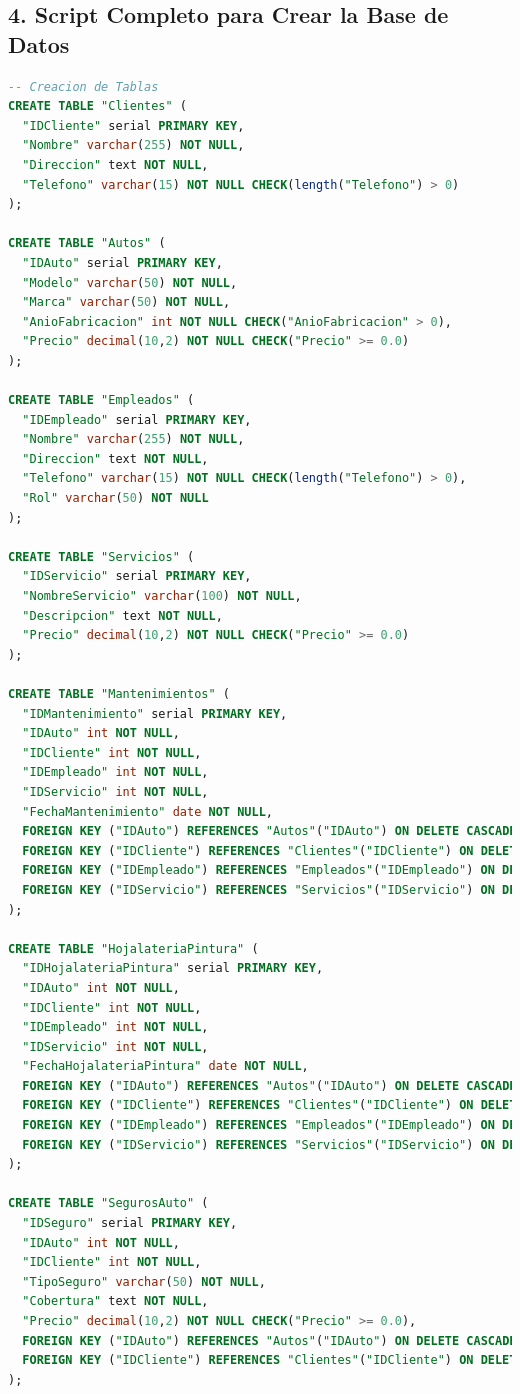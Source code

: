 \documentclass[12pt]{article}
\begin{document}
    \subsection*{4. Script Completo para Crear la Base de Datos}
    \begin{lstlisting}[language=SQL]
-- Creacion de Tablas
CREATE TABLE "Clientes" (
  "IDCliente" serial PRIMARY KEY,
  "Nombre" varchar(255) NOT NULL,
  "Direccion" text NOT NULL,
  "Telefono" varchar(15) NOT NULL CHECK(length("Telefono") > 0)
);

CREATE TABLE "Autos" (
  "IDAuto" serial PRIMARY KEY,
  "Modelo" varchar(50) NOT NULL,
  "Marca" varchar(50) NOT NULL,
  "AnioFabricacion" int NOT NULL CHECK("AnioFabricacion" > 0),
  "Precio" decimal(10,2) NOT NULL CHECK("Precio" >= 0.0)
);

CREATE TABLE "Empleados" (
  "IDEmpleado" serial PRIMARY KEY,
  "Nombre" varchar(255) NOT NULL,
  "Direccion" text NOT NULL,
  "Telefono" varchar(15) NOT NULL CHECK(length("Telefono") > 0),
  "Rol" varchar(50) NOT NULL
);

CREATE TABLE "Servicios" (
  "IDServicio" serial PRIMARY KEY,
  "NombreServicio" varchar(100) NOT NULL,
  "Descripcion" text NOT NULL,
  "Precio" decimal(10,2) NOT NULL CHECK("Precio" >= 0.0)
);

CREATE TABLE "Mantenimientos" (
  "IDMantenimiento" serial PRIMARY KEY,
  "IDAuto" int NOT NULL,
  "IDCliente" int NOT NULL,
  "IDEmpleado" int NOT NULL,
  "IDServicio" int NOT NULL,
  "FechaMantenimiento" date NOT NULL,
  FOREIGN KEY ("IDAuto") REFERENCES "Autos"("IDAuto") ON DELETE CASCADE ON UPDATE CASCADE,
  FOREIGN KEY ("IDCliente") REFERENCES "Clientes"("IDCliente") ON DELETE CASCADE ON UPDATE CASCADE,
  FOREIGN KEY ("IDEmpleado") REFERENCES "Empleados"("IDEmpleado") ON DELETE CASCADE ON UPDATE CASCADE,
  FOREIGN KEY ("IDServicio") REFERENCES "Servicios"("IDServicio") ON DELETE CASCADE ON UPDATE CASCADE
);

CREATE TABLE "HojalateriaPintura" (
  "IDHojalateriaPintura" serial PRIMARY KEY,
  "IDAuto" int NOT NULL,
  "IDCliente" int NOT NULL,
  "IDEmpleado" int NOT NULL,
  "IDServicio" int NOT NULL,
  "FechaHojalateriaPintura" date NOT NULL,
  FOREIGN KEY ("IDAuto") REFERENCES "Autos"("IDAuto") ON DELETE CASCADE ON UPDATE CASCADE,
  FOREIGN KEY ("IDCliente") REFERENCES "Clientes"("IDCliente") ON DELETE CASCADE ON UPDATE CASCADE,
  FOREIGN KEY ("IDEmpleado") REFERENCES "Empleados"("IDEmpleado") ON DELETE CASCADE ON UPDATE CASCADE,
  FOREIGN KEY ("IDServicio") REFERENCES "Servicios"("IDServicio") ON DELETE CASCADE ON UPDATE CASCADE
);

CREATE TABLE "SegurosAuto" (
  "IDSeguro" serial PRIMARY KEY,
  "IDAuto" int NOT NULL,
  "IDCliente" int NOT NULL,
  "TipoSeguro" varchar(50) NOT NULL,
  "Cobertura" text NOT NULL,
  "Precio" decimal(10,2) NOT NULL CHECK("Precio" >= 0.0),
  FOREIGN KEY ("IDAuto") REFERENCES "Autos"("IDAuto") ON DELETE CASCADE ON UPDATE CASCADE,
  FOREIGN KEY ("IDCliente") REFERENCES "Clientes"("IDCliente") ON DELETE CASCADE ON UPDATE CASCADE
);
    \end{lstlisting}
\end{document}
